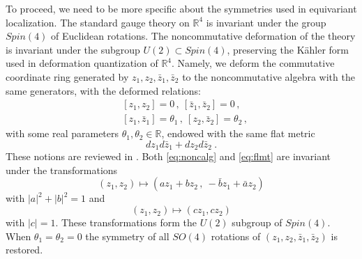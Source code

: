 \documentclass[12pt]{article}
\numberwithin{equation}{section}
\newcommand\beq{\begin{equation}}
\newcommand\eeq{\end{equation}}
\theoremstyle{definition}
\newcommand {\BR}   {\mathbb R}
\begin{document}
To proceed, we need to be more specific about the symmetries used in equivariant localization.
The standard gauge theory on ${\BR}^{4}$ is invariant under the group $Spin(4)$ of Euclidean rotations. The noncommutative deformation of the theory is invariant under the subgroup $U(2) \subset Spin(4)$, preserving the K{\"a}hler form used in deformation quantization of ${\BR}^{4}$. Namely, we deform the commutative coordinate ring generated by $z_1, z_2, {\bar z}_{1}, {\bar z}_{2}$ to the noncommutative algebra with the same generators, with the deformed relations:
\beq
\begin{aligned}
& [z_{1}, z_{2} ] = 0\, , \ [{\bar z}_{1}, {\bar z}_{2}] = 0 \,  ,\\
& [z_{1}, {\bar z}_{1}] = {\theta}_{1}\, , \ [ z_{2}, {\bar z}_{2} ]= {\theta}_{2}\,  , 
\end{aligned}
\label{eq:noncalg}
\eeq
with some real parameters ${\theta}_{1}, {\theta}_{2} \in {\BR}$, 
endowed with the same flat metric 
\beq
dz_{1} d{\bar z}_{1} + dz_{2} d{\bar z}_{2}\ . 
\label{eq:flmt}
\eeq
These notions are reviewed in \cite{Nekrasov:1998ss}.  
Both \eqref{eq:noncalg} and \eqref{eq:flmt} are invariant under the transformations
\beq
(z_{1}, z_{2}) \mapsto  \left( a z_{1} + b z_{2} \, , \ - {\bar b} z_{1} + {\bar a} z_{2} \right)
\eeq
with $|a|^2+ |b|^2 = 1$ and 
\beq
(z_{1}, z_{2}) \mapsto (c z_{1}, c z_{2}) 
\eeq
with $|c| = 1$. These transformations form the $U(2)$ subgroup of $Spin(4)$. When ${\theta}_{1} = {\theta}_{2} = 0$ the symmetry of all $SO(4)$ rotations of $(z_1, z_2, {\bar z}_1, {\bar z}_2)$
is restored. 
\end{document}
